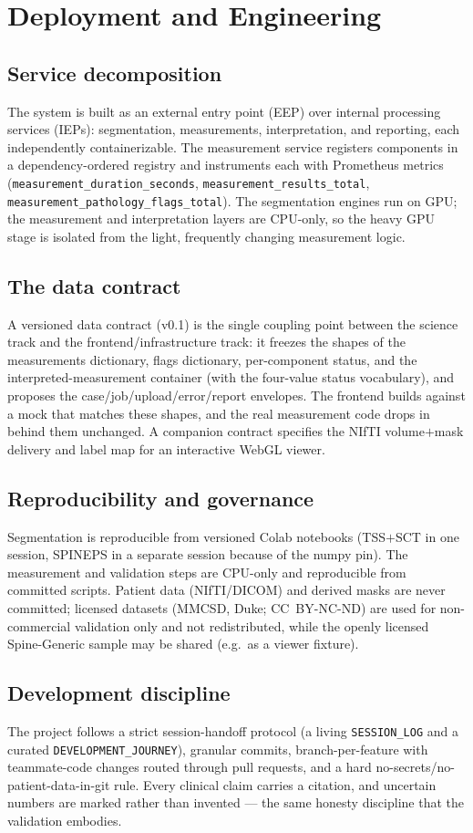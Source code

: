 \section{Deployment and Engineering}
\label{sec:deploy}

\subsection{Service decomposition}
The system is built as an external entry point (EEP) over internal processing services (IEPs):
segmentation, measurements, interpretation, and reporting, each independently containerizable. The
measurement service registers components in a dependency-ordered registry and instruments each with
Prometheus metrics (\texttt{measurement\_duration\_seconds}, \texttt{measurement\_results\_total},
\texttt{measurement\_pathology\_flags\_total}). The segmentation engines run on GPU; the measurement and
interpretation layers are CPU-only, so the heavy GPU stage is isolated from the light, frequently changing
measurement logic.

\subsection{The data contract}
A versioned data contract (v0.1) is the single coupling point between the science track and the
frontend/infrastructure track: it freezes the shapes of the measurements dictionary, flags dictionary,
per-component status, and the interpreted-measurement container (with the four-value status vocabulary),
and proposes the case/job/upload/error/report envelopes. The frontend builds against a mock that matches
these shapes, and the real measurement code drops in behind them unchanged. A companion contract specifies
the NIfTI volume$+$mask delivery and label map for an interactive WebGL viewer.

\subsection{Reproducibility and governance}
Segmentation is reproducible from versioned Colab notebooks (TSS$+$SCT in one session, SPINEPS in a
separate session because of the numpy pin). The measurement and validation steps are CPU-only and
reproducible from committed scripts. Patient data (NIfTI/DICOM) and derived masks are never committed;
licensed datasets (MMCSD, Duke; CC~BY-NC-ND) are used for non-commercial validation only and not
redistributed, while the openly licensed Spine-Generic sample may be shared (e.g.\ as a viewer fixture).

\subsection{Development discipline}
The project follows a strict session-handoff protocol (a living \texttt{SESSION\_LOG} and a curated
\texttt{DEVELOPMENT\_JOURNEY}), granular commits, branch-per-feature with teammate-code changes routed
through pull requests, and a hard no-secrets/no-patient-data-in-git rule. Every clinical claim carries a
citation, and uncertain numbers are marked rather than invented --- the same honesty discipline that the
validation embodies.
